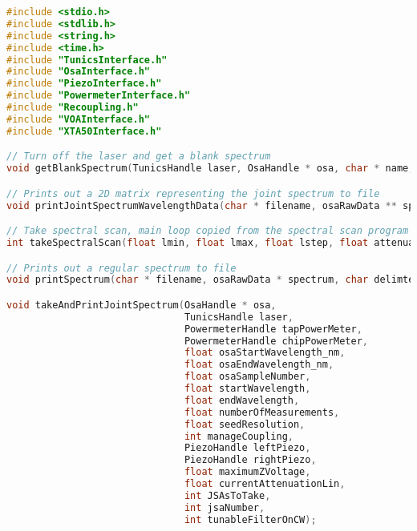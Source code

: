 \begin{lstlisting}[style=customc, language=C]
#include <stdio.h>
#include <stdlib.h>
#include <string.h>
#include <time.h>
#include "TunicsInterface.h"
#include "OsaInterface.h"
#include "PiezoInterface.h"
#include "PowermeterInterface.h"
#include "Recoupling.h"
#include "VOAInterface.h"
#include "XTA50Interface.h"

// Turn off the laser and get a blank spectrum
void getBlankSpectrum(TunicsHandle laser, OsaHandle * osa, char * name, int amount);

// Prints out a 2D matrix representing the joint spectrum to file
void printJointSpectrumWavelengthData(char * filename, osaRawData ** spectrum, char delimter, int numberOfSeedReadings);

// Take spectral scan, main loop copied from the spectral scan program
int takeSpectralScan(float lmin, float lmax, float lstep, float attenuation,PowermeterHandle outmeter,PowermeterHandle outmeter2, TunicsHandle laser);

// Prints out a regular spectrum to file
void printSpectrum(char * filename, osaRawData * spectrum, char delimter);

void takeAndPrintJointSpectrum(OsaHandle * osa,
                               TunicsHandle laser,
                               PowermeterHandle tapPowerMeter,
                               PowermeterHandle chipPowerMeter,
                               float osaStartWavelength_nm,
                               float osaEndWavelength_nm,
                               float osaSampleNumber,
                               float startWavelength,
                               float endWavelength,
                               float numberOfMeasurements,
                               float seedResolution,
                               int manageCoupling,
                               PiezoHandle leftPiezo,
                               PiezoHandle rightPiezo,
                               float maximumZVoltage,
                               float currentAttenuationLin,
                               int JSAsToTake,
                               int jsaNumber,
                               int tunableFilterOnCW);


\end{lstlisting}
